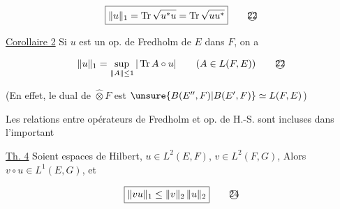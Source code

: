 \[
\boxed{\|u\|_1=\operatorname{Tr}\sqrt{u^*u}=\operatorname{Tr}\sqrt{uu^*}} \tag*{\textcircled{22}}
\]

\uline{Corollaire 2} Si $u$ est un op. de Fredholm de $E$ dans $F$,
on a

\[
\|u\|_1=\sup_{\|A\|\leq1}|\operatorname{Tr} A\circ u|\qquad(A\in L(F,E)) \tag*{\textcircled{22}}
\]

(En effet, le dual de $\widehat\otimes F$ est $\unsure{B(E'',F)|B(E',F)}\simeq L(F,E)$) 


 Les relations entre opérateurs de Fredholm et op.
de H.-S. sont incluses dans l'important

\uline{Th. 4} Soient   espaces de Hilbert, $u\in L^2(E,F)$, $v\in L^2(F,G)$,
Alors $v\circ u\in L^1(E,G)$, et 

\[
\boxed{\|vu\|_1\leq\|v\|_2\,\|u\|_2} \tag*{\textcircled{24}}
\]

